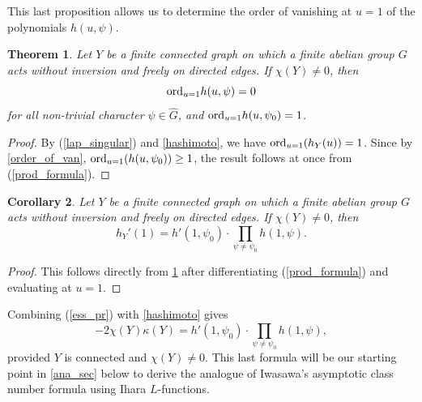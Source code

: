 \documentclass[11pt]{amsart}
\newtheorem{theorem}{Theorem}[section]
\newtheorem{corollary}[theorem]{Corollary}
\numberwithin{equation}{section}
\theoremstyle{remark}
\theoremstyle{definition}
\begin{document}
This last proposition allows us to determine the order of vanishing at $u=1$ of the polynomials $h(u,\psi)$.
\begin{theorem} \label{order_of_vanishing}
Let $Y$ be a finite connected graph on which a finite abelian group $G$ acts without inversion and freely on directed edges.  If $\chi(Y) \neq 0$, then 
$${\rm ord}_{u=1}h(u,\psi) = 0 $$
for all non-trivial character $\psi \in \widehat{G}$, and ${\rm ord}_{u=1}h(u,\psi_{0}) = 1$.
\end{theorem}
\begin{proof}
By (\ref{lap_singular}) and \cref{hashimoto}, we have ${\rm ord}_{u=1}(h_{Y}(u)) = 1$.  Since by \cref{order_of_van}, ${\rm ord}_{u=1}(h(u,\psi_{0})) \ge 1$, the result follows at once from (\ref{prod_formula}).
\end{proof}

\begin{corollary}
Let $Y$ be a finite connected graph on which a finite abelian group $G$ acts without inversion and freely on directed edges.  If $\chi(Y) \neq 0$, then 
\begin{equation} \label{ess_pr}
h_{Y}'(1) = h'(1,\psi_{0}) \cdot \prod_{\psi \neq \psi_{0}} h(1,\psi).
\end{equation}
\end{corollary}
\begin{proof}
This follows directly from \cref{order_of_vanishing} after differentiating (\ref{prod_formula}) and evaluating at $u=1$.
\end{proof}
Combining (\ref{ess_pr}) with \cref{hashimoto} gives
\begin{equation} \label{starting_pt}
-2 \chi(Y) \kappa(Y) = h'(1,\psi_{0}) \cdot \prod_{\psi \neq \psi_{0}} h(1,\psi), 
\end{equation}
provided $Y$ is connected and $\chi(Y) \neq 0$.  This last formula will be our starting point in \cref{ana_sec} below to derive the analogue of Iwasawa's asymptotic class number formula using Ihara $L$-functions.  

\end{document}
